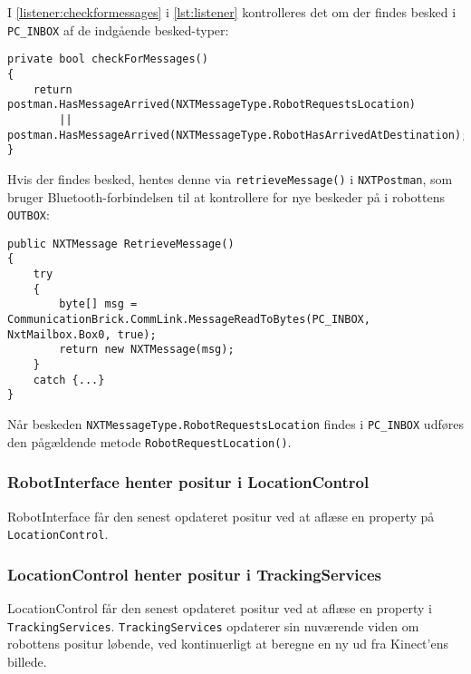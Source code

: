 I \cref{listener:checkformessages} i \cref{lst:listener} kontrolleres det om der findes besked i \lstinline[style=csharp]!PC_INBOX! af de indgående besked-typer:

\begin{lstlisting}[style=csharpsmall,label=lst:checkformessages]
private bool checkForMessages()
{
    return postman.HasMessageArrived(NXTMessageType.RobotRequestsLocation)
        || postman.HasMessageArrived(NXTMessageType.RobotHasArrivedAtDestination);
}
\end{lstlisting}

Hvis der findes besked, hentes denne via \lstinline[style=csharp]!retrieveMessage()! i \lstinline[style=csharp]!NXTPostman!, som bruger Bluetooth-forbindelsen til at kontrollere for nye beskeder på i robottens \lstinline[style=c]!OUTBOX!:

\begin{lstlisting}[style=csharpsmall,label=lst:postman,caption=NXTPostman henter besked fra robot]
public NXTMessage RetrieveMessage()
{
    try
    {
        byte[] msg = CommunicationBrick.CommLink.MessageReadToBytes(PC_INBOX, NxtMailbox.Box0, true);
        return new NXTMessage(msg);
    }
    catch {...}
}
\end{lstlisting}

Når beskeden \lstinline[style=csharp]!NXTMessageType.RobotRequestsLocation! findes i \lstinline[style=csharp]!PC_INBOX! udføres den pågældende metode \lstinline[style=csharp]!RobotRequestLocation()!.


\subsubsection{RobotInterface henter positur i LocationControl}
RobotInterface får den senest opdateret positur ved at aflæse en property på \lstinline[style=csharp]!LocationControl!.

\subsubsection{LocationControl henter positur i TrackingServices}
LocationControl får den senest opdateret positur ved at aflæse en property i \lstinline[style=csharp]!TrackingServices!.
\lstinline[style=csharp]!TrackingServices! opdaterer sin nuværende viden om robottens positur løbende, ved kontinuerligt at beregne en ny ud fra Kinect'ens billede.

